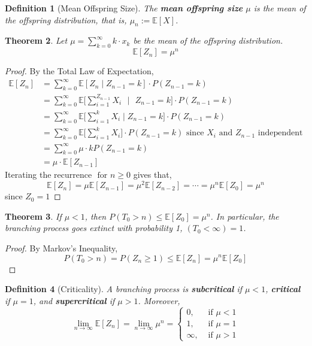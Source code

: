 \documentclass{tufte-handout}
\newtheorem{thm}{Theorem}
\newtheorem{defn}[thm]{Definition}
\begin{document}
  \begin{defn}[Mean Offspring Size]
    The \textbf{mean offspring size} $\mu$ is the mean of the offspring distribution, that is, $\mu_n := \mathbb{E}[X]$.
  \end{defn}

  \begin{thm}
    Let $\mu = \sum_{k = 0}^{\infty} k \cdot x_k$ be the mean of the offspring distribution.
    \[\mathbb{E}[Z_n] = \mu^n\]
  \end{thm}

  \begin{proof}
    By the Total Law of Expectation,
    \begin{align*}
      \mathbb{E}[Z_{n}] &=\sum_{k=0}^{\infty} \mathbb{E}[Z_{n} \mid Z_{n-1}=k] \cdot P\left(Z_{n-1}=k\right) \\
      &=\sum_{k=0}^{\infty} \mathbb{E}\bigg[\sum_{i=1}^{Z_{n-1}} X_{i} \text{ }\bigg|\text{ } Z_{n-1}=k\bigg] \cdot P\left(Z_{n-1}=k\right) \\
      &= \sum_{k=0}^{\infty} \mathbb{E}\bigg[\sum_{i=1}^{k} X_{i} \mid Z_{n-1}=k\bigg] \cdot P\left(Z_{n-1}=k\right) \\
      &=\sum_{k=0}^{\infty} \mathbb{E}\bigg[\sum_{i=1}^{k} X_{i}\bigg] \cdot P\left(Z_{n-1}=k\right) \text{ since } X_i \text{ and } Z_{n-1} \text{ independent} \\
      &= \sum_{k=0}^{\infty} \mu \cdot k P\left(Z_{n-1}=k\right) \\
      &= \mu \cdot \mathbb{E}[Z_{n-1}]
    \end{align*}
    \noindent Iterating the recurrence $\text { for } n \geq 0$ gives that,
    \[\mathbb{E}[Z_{n}]=\mu \mathbb{E}[Z_{n-1}]=\mu^{2} \mathbb{E}[Z_{n-2}]=\cdots=\mu^{n} \mathbb{E}[Z_{0}]=\mu^{n}\]
    \noindent since $Z_0 = 1$
  \end{proof}

\begin{thm}
  If $\mu < 1$, then $P(T_0 > n) \leq \mathbb{E}[Z_{0}]=\mu^{n}$. In particular, the branching process goes extinct with probability 1, $(T_0 < \infty) = 1$.
\end{thm}

\begin{proof}
  By Markov's Inequality,
  \[P(T_0 > n) = P(Z_n \geq 1) \leq \mathbb{E}[Z_n] = \mu^{n}\mathbb{E}[Z_{0}]\]
\end{proof}

\begin{defn}[Criticality]
  A branching process is \textbf{subcritical} if $\mu < 1$, \textbf{critical} if $\mu = 1$, and \textbf{supercritical} if $\mu > 1$. Moreover,
  \[\lim _{n \rightarrow \infty} \mathbb{E}[Z_{n}]=\lim _{n \rightarrow \infty} \mu^{n}= \begin{cases}0, & \text { if } \mu<1 \\ 1, & \text { if } \mu=1 \\ \infty, & \text { if } \mu>1\end{cases}\]
\end{defn}
\end{document}
